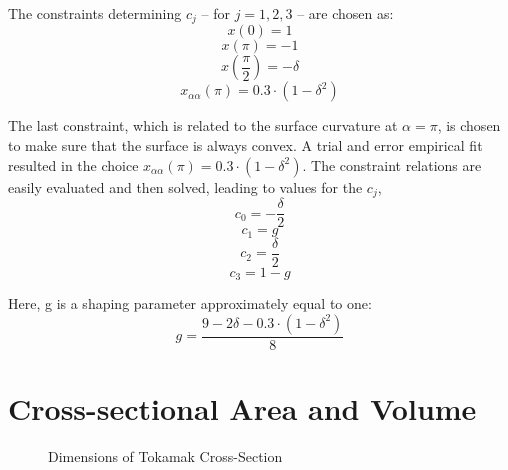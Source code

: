 The constraints determining $c_j$ -- for $j = 1,2,3$ -- are chosen as:
\begin{equation}
	x(0) = 1
\end{equation}
\begin{equation}
	x(\pi) = -1
\end{equation}
\begin{equation}
	x\left(\frac{\pi}{2}\right) = -\delta
\end{equation}
\begin{equation}
	x_{\alpha\alpha}(\pi) = 0.3 \cdot ( 1 - \delta ^2 )
\end{equation}

The last constraint, which is related to the surface curvature at $\alpha = \pi$, is chosen to make sure that the surface is always convex. A trial and error empirical fit resulted in the choice $x_{\alpha\alpha}(\pi) = 0.3 \cdot ( 1 - \delta ^2 )$. The constraint relations are easily evaluated and then solved, leading to values for the $c_j$,
\begin{equation}
	c_0 = { - \frac{ \delta }{ 2 } }
\end{equation}
\begin{equation}
	c_1 = g
\end{equation}
\begin{equation}
	c_2 = { \frac{ \delta }{ 2 } }
\end{equation}
\begin{equation}
	c_3 = 1 - g
\end{equation}

Here, g is a shaping parameter approximately equal to one:
\begin{equation}
	g = \frac{9 - 2 \delta - 0.3 \cdot ( 1 - \delta ^2 ) }{8}
\end{equation}

\section{Cross-sectional Area and Volume}

\begin{figure}
\centering

\caption{Dimensions of Tokamak Cross-Section}
\label{fig:dims}
\end{figure}


